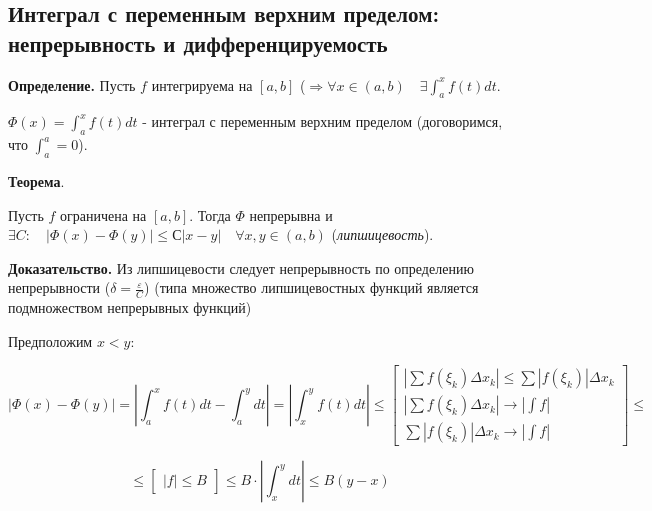 \documentclass[a4paper]{article}
\begin{document}
\begin{definit}
\hypertarget{p12}{}
\subsection*{Интеграл с переменным верхним пределом: непрерывность и дифференцируемость}

\textbf{Определение.} Пусть $f$ интегрируема на $[a,b]$ ($\Rightarrow \forall x \in (a,b) \quad \exists \int_a^x f(t)dt$.

$\Phi(x) = \int_a^x f(t)dt$ - интеграл с переменным верхним пределом (договоримся, что $\int_a^a = 0$).

\begin{htheorem}\textbf{Теорема}.

Пусть $f$ ограничена на $[a,b]$. Тогда $\Phi$ непрерывна и $\exists C: \quad |\Phi(x) - \Phi(y)| \leq С|x-y| \quad \forall x, y \in (a,b)$ (\textit{липшицевость}).
\end{htheorem}

\begin{hproof}\textbf{Доказательство.}
Из липшицевости следует непрерывность по определению непрерывности ($\delta = \frac{\varepsilon}{C}$) (типа множество липшицевостных функций является подмножеством непрерывных функций)


Предположим $x<y$:

\[
	|\Phi(x) - \Phi(y)| = \left| \int_a^x f(t)dt - \int_a^y dt \right| = \left| \int_x^y f(t)dt \right| \leq \begin{bmatrix}
	\left| \sum f(\xi_k) \Delta x_k \right| \leq \sum \left| f(\xi_k) \right| \Delta x_k \\
	\left| \sum f(\xi_k) \Delta x_k \right| \rightarrow |\int f| \\
	 \sum \left| f(\xi_k) \right| \Delta x_k \rightarrow |\int f|
	\end{bmatrix} \leq
\]
 
\[ \leq
 \begin{bmatrix}
 |f| \leq B
 \end{bmatrix} \leq B \cdot \left| \int_x^y dt \right| \leq B(y-x)
\]
\end{hproof}


\end{definit}
\end{document}
